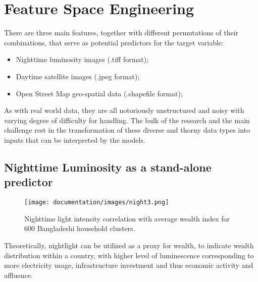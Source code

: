 \documentclass[solid,math,chem,code,plot,gloss]{bmc}
\begin{document}
\section{Feature Space Engineering}

There are three main features, together with different permutations of their combinations, that serve as potential predictors for the target variable: 

\begin{info}
\begin{itemize}
    \item Nighttime luminosity images (.tiff format);
    \item Daytime satellite images (.jpeg format);
    \item Open Street Map geo-spatial data (.shapefile format);
\end{itemize}
\end{info}

As with real world data, they are all notoriously unstructured and noisy with varying degree of difficulty for handling. The bulk of the research and the main challenge rest in the transformation of these diverse and thorny data types into inputs that can be interpreted by the models. 

\subsection{Nighttime Luminosity as a stand-alone predictor}


\begin{wrapfigure}{L}{0.7\textwidth}
\centering
\texttt{[image: documentation/images/night3.png]}
\caption{\label{fig:frog2}Nighttime light intensity correlation with average wealth index for 600 Bangladeshi household clusters.}
\end{wrapfigure}

Theoretically, nightlight can be utilized as a proxy for wealth, to indicate wealth distribution within a country, with higher level of luminescence corresponding to more electricity usage, infrastructure investment and thus economic activity and affluence. 

\end{document}
